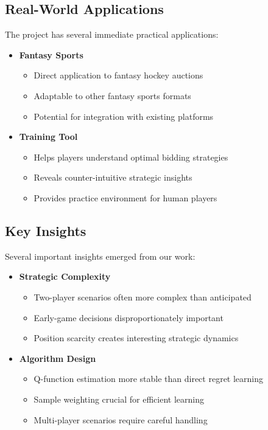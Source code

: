 \documentclass[11pt]{article}
\begin{document}
\subsection{Real-World Applications}
The project has several immediate practical applications:

\begin{itemize}
    \item \textbf{Fantasy Sports}
    \begin{itemize}
        \item Direct application to fantasy hockey auctions
        \item Adaptable to other fantasy sports formats
        \item Potential for integration with existing platforms
    \end{itemize}
    
    \item \textbf{Training Tool}
    \begin{itemize}
        \item Helps players understand optimal bidding strategies
        \item Reveals counter-intuitive strategic insights
        \item Provides practice environment for human players
    \end{itemize}
\end{itemize}

\subsection{Key Insights}
Several important insights emerged from our work:

\begin{itemize}
    \item \textbf{Strategic Complexity}
    \begin{itemize}
        \item Two-player scenarios often more complex than anticipated
        \item Early-game decisions disproportionately important
        \item Position scarcity creates interesting strategic dynamics
    \end{itemize}
    
    \item \textbf{Algorithm Design}
    \begin{itemize}
        \item Q-function estimation more stable than direct regret learning
        \item Sample weighting crucial for efficient learning
        \item Multi-player scenarios require careful handling
    \end{itemize}
\end{itemize}
\end{document}
